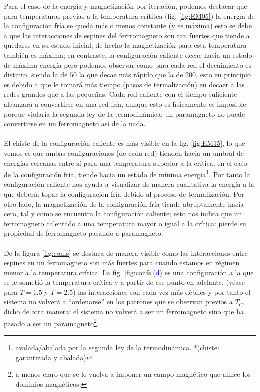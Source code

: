 \documentclass[11pt,a4paper]{article}
\begin{document}
Para el caso de la energía y magnetización por iteración, podemos destacar que para temperaturas previas a la temperatura crítitca (fig. \ref{fig:EM05}) la energía de la configuración fría se queda más o menos constante (y es máxima) esto se debe a que las interacciones de espines del ferrromagneto son  tan fuertes que tiende a quedarse en su estado inicial, de hecho la magnetización para esta temperatura también es máxima; en contraste, la configuración caliente decae hacia un estado de máxima energía pero podemos observar como para cada red el decaimiento es distinto, siendo la de $50$  la que decae más rápido que la de $200$, esto en principio es debido a que le tomará más tiempo (pasos de termalización) en decaer a las redes grandes que a las pequeñas. Cada red caliente con el tiempo suficiente alcanzará a convertirse en una red fría, aunque esto es físicamente es imposible porque violaría la segunda ley de la termodinámica: un paramagneto no puede convertirse en un ferromagneto así de la nada.\\
\\
El chiste de la configuración caliente es más visible en la fig. \ref{fig:EM15}, lo que vemos es que ambas configuraciones (de cada red) tienden hacia un umbral de energías  cercanas entre sí para una temperatura superior a la crítica; en el caso de la configuración fría, tiende hacia un estado de mínima energía\footnote{avalada/abalada por la segunda ley de la termodinámica. *(chiste: garantizada y abalada)}. Por tanto la configuración caliente nos ayuda a visualizar de manera cualitativa la energía a la que debería topar la configuración fría debido al proceso de termalización. Por otro lado, la magnetización de la configuración fría tiende abruptamente hacia cero, tal y como se encuentra la configuración caliente; esto nos indica que un ferromagneto calentado a una temperatura mayor o igual a la crítica: pierde su propiedad de ferromagneto pasando a paramagneto.\\
\\
De la figura \ref{fig:confs} se destaca de manera visible como las interacciones entre espines en un ferromagneto son más fuertes para cuando estamos en régimen menor a la temperatura crítica. La fig. \ref{fig:confs}\textcolor{blue}{(d)} es una configuración a la que se le sometió la temperatura crítica y a partir de ese punto en adelante, (véase para $T=1.5$ y $T=2.5$) las interacciones son cada vez más débiles y por tanto el sistema no volverá a “ordenarse'' en los patrones que se observan previos a $T_C$, dicho de otra manera: el sistema no volverá a ser un ferromagneto sino que ha pasado a ser un paramagneto\footnote{a menos claro que se le vuelva a imponer un campo magnético que alinee los dominios magnéticos.}.
\end{document}
